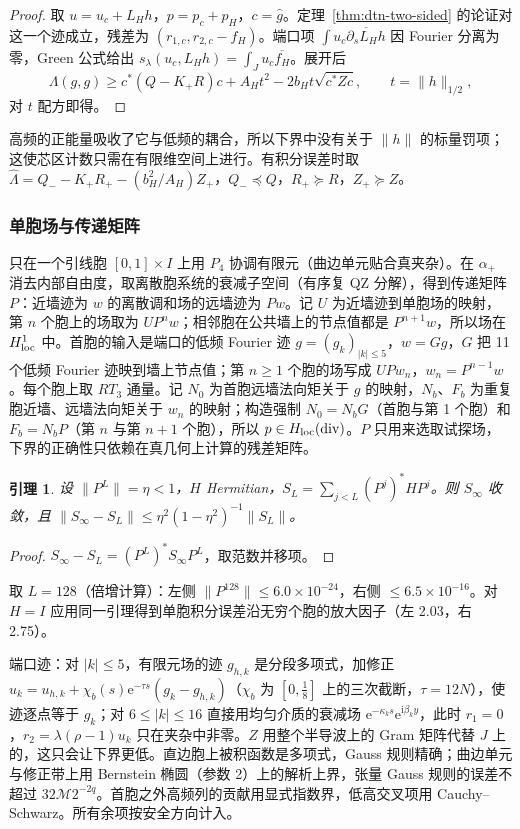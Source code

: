 \documentclass[11pt,a4paper,fontset=fandol]{ctexart}
\newcommand{\ii}{\mathrm{i}}
\newcommand{\ee}{\mathrm{e}}
\theoremstyle{plain}
\newtheorem{lemma}[theorem]{引理}
\theoremstyle{definition}
\theoremstyle{remark}
\begin{document}
\begin{proof}
取 $u=u_c+L_Hh$，$p=p_c+p_H$，$c=\hat g$。定理~\ref{thm:dtn-two-sided} 的论证对这一个迹成立，残差为 $(r_{1,c},r_{2,c}-f_H)$。端口项 $\int u_c\overline{\partial_sL_Hh}$ 因 Fourier 分离为零，Green 公式给出 $s_\lambda(u_c,L_Hh)=\int_Ju_c\overline{f_H}$。展开后
\[
\Lambda(g,g)\ge c^*(Q-K_+R)c+A_Ht^2-2b_Ht\sqrt{c^*Zc},\qquad t=\|h\|_{1/2},
\]
对 $t$ 配方即得。
\end{proof}

高频的正能量吸收了它与低频的耦合，所以下界中没有关于 $\|h\|$ 的标量罚项；这使芯区计数只需在有限维空间上进行。有积分误差时取 $\hat\Lambda=Q_--K_+R_+-(b_H^2/A_H)Z_+$，$Q_-\preceq Q$，$R_+\succeq R$，$Z_+\succeq Z$。

\subsubsection{单胞场与传递矩阵}

只在一个引线胞 $[0,1]\times I$ 上用 $P_4$ 协调有限元（曲边单元贴合真夹杂）。在 $\alpha_+$ 消去内部自由度，取离散胞系统的衰减子空间（有序复 QZ 分解），得到传递矩阵 $P$：近墙迹为 $w$ 的离散调和场的远墙迹为 $Pw$。记 $U$ 为近墙迹到单胞场的映射，第 $n$ 个胞上的场取为 $UP^nw$；相邻胞在公共墙上的节点值都是 $P^{n+1}w$，所以场在 $H^1_{\rm loc}$ 中。首胞的输入是端口的低频 Fourier 迹 $g=(g_k)_{|k|\le5}$，$w=Gg$，$G$ 把 11 个低频 Fourier 迹映到墙上节点值；第 $n\ge1$ 个胞的场写成 $UPw_n$，$w_n=P^{n-1}w$。每个胞上取 $RT_3$ 通量。记 $N_0$ 为首胞远墙法向矩关于 $g$ 的映射，$N_b$、$F_b$ 为重复胞近墙、远墙法向矩关于 $w_n$ 的映射；构造强制 $N_0=N_bG$（首胞与第 1 个胞）和 $F_b=N_bP$（第 $n$ 与第 $n+1$ 个胞），所以 $p\in H_{\rm loc}(\operatorname{div})$。$P$ 只用来选取试探场，下界的正确性只依赖在真几何上计算的残差矩阵。

\begin{lemma}
\label{lem:transfer-tail}
设 $\|P^L\|=\eta<1$，$H$ Hermitian，$S_L=\sum_{j<L}(P^j)^*HP^j$。则 $S_\infty$ 收敛，且 $\|S_\infty-S_L\|\le\eta^2(1-\eta^2)^{-1}\|S_L\|$。
\end{lemma}

\begin{proof}
$S_\infty-S_L=(P^L)^*S_\infty P^L$，取范数并移项。
\end{proof}

取 $L=128$（倍增计算）：左侧 $\|P^{128}\|\le6.0\times10^{-24}$，右侧 $\le6.5\times10^{-16}$。对 $H=I$ 应用同一引理得到单胞积分误差沿无穷个胞的放大因子（左 2.03，右 2.75）。

端口迹：对 $|k|\le5$，有限元场的迹 $g_{h,k}$ 是分段多项式，加修正 $u_k=u_{h,k}+\chi_b(s)\ee^{-\tau s}(g_k-g_{h,k})$（$\chi_b$ 为 $[0,\frac18]$ 上的三次截断，$\tau=12N$），使迹逐点等于 $g_k$；对 $6\le|k|\le16$ 直接用均匀介质的衰减场 $\ee^{-\kappa_ks}\ee^{\ii\beta_ky}$，此时 $r_1=0$，$r_2=\lambda(\rho-1)u_k$ 只在夹杂中非零。$Z$ 用整个半导波上的 Gram 矩阵代替 $J$ 上的，这只会让下界更低。直边胞上被积函数是多项式，Gauss 规则精确；曲边单元与修正带上用 Bernstein 椭圆（参数 2）上的解析上界，张量 Gauss 规则的误差不超过 $32\mathcal M2^{-2q}$。首胞之外高频列的贡献用显式指数界，低高交叉项用 Cauchy--Schwarz。所有余项按安全方向计入。
\end{document}
